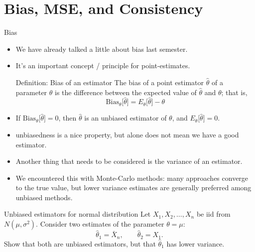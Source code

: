\section{Bias, MSE, and Consistency}

\begin{frame}[allowframebreaks]{Bias}

\begin{itemize}
  \item We have already talked a little about bias last semester.
  \item It's an important concept / principle for point-estimates.

\begin{block}{Definition: Bias of an estimator}
  The \alert{bias} of a point estimator $\hat{\theta}$ of a parameter $\theta$ is the difference between the expected value of $\hat{\theta}$ and $\theta$; that is,
  $$\text{Bias}_\theta\big[\hat{\theta}\big] = E_\theta\big[\hat{\theta}\big] - \theta$$
\end{block}

 \item If $\text{Bias}_\theta\big[\hat{\theta}\big] = 0$, then $\hat{\theta}$ is an \alert{unbiased} estimator of $\theta$, and $E_\theta\big[\hat{\theta}\big] = 0$.

\framebreak
  \item \alert{unbiasedness} is a nice property, but alone does not mean we have a good estimator.
  \item Another thing that needs to be considered is the \alert{variance} of an estimator.
  \item We encountered this with Monte-Carlo methods: many approaches converge to the true value, but lower variance estimates are generally preferred among unbiased methods.
\end{itemize}

\begin{exampleblock}{Unbiased estimators for normal distribution}
  Let $X_1, X_2, \ldots, X_n$ be iid from $N(\mu, \sigma^2)$. Consider two estimates of the parameter $\theta = \mu$:
  $$
  \hat{\theta}_1 = \bar{X}_n, \quad\quad \hat{\theta}_2 = X_1.
  $$
  Show that both are unbiased estimators, but that $\hat{\theta}_1$ has lower variance.
\end{exampleblock}

\end{frame}


